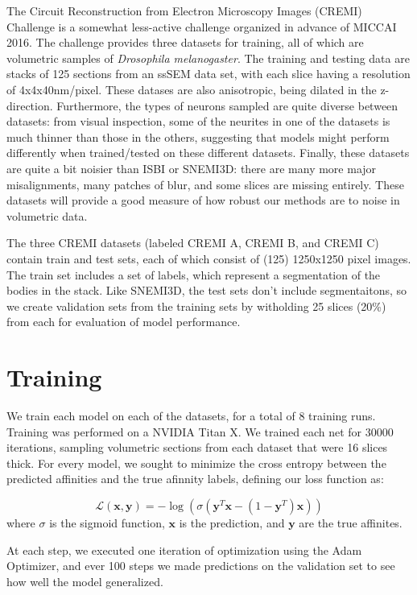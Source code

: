 The Circuit Reconstruction from Electron Microscopy Images (CREMI) Challenge is a somewhat less-active challenge organized in advance of MICCAI 2016\cite{Funke.Jan2016}. The challenge provides three datasets for training, all of which are volumetric samples of \textit{Drosophila melanogaster}. The training and testing data are stacks of 125 sections from an ssSEM data set, with each slice having a resolution of 4x4x40nm/pixel. These datases are also anisotropic, being dilated in the z-direction. Furthermore, the types of neurons sampled are quite diverse between datasets: from visual inspection, some of the neurites in one of the datasets is much thinner than those in the others, suggesting that models might perform differently when trained/tested on these different datasets. Finally, these datasets are quite a bit noisier than ISBI or SNEMI3D: there are many more major misalignments, many patches of blur, and some slices are missing entirely. These datasets will provide a good measure of how robust our methods are to noise in volumetric data.

The three CREMI datasets (labeled CREMI A, CREMI B, and CREMI C) contain train and test sets, each of which consist of (125) 1250x1250 pixel images. The train set includes a set of labels, which represent a segmentation of the bodies in the stack. Like SNEMI3D, the test sets don't include segmentaitons, so we create validation sets from the training sets by witholding 25 slices (20\%) from each for evaluation of model performance.

\section{Training}

We train each model on each of the datasets, for a total of 8 training runs. Training was performed on a NVIDIA Titan X. We trained each net for 30000 iterations, sampling volumetric sections from each dataset that were 16 slices thick. For every model, we sought to minimize the cross entropy between the predicted affinities and the true afinnity labels, defining our loss function as:

$$\mathcal{L}(\bm{x}, \bm{y}) =-\log(\sigma(\bm{y}^{T}\bm{x}-(1-\bm{y}^{T})\bm{x}))$$
where $\sigma$ is the sigmoid function, $\bm{x}$ is the prediction, and $\bm{y}$ are the true affinites.

At each step, we executed one iteration of optimization using the Adam Optimizer, and ever 100 steps we made predictions on the validation set to see how well the model generalized.

